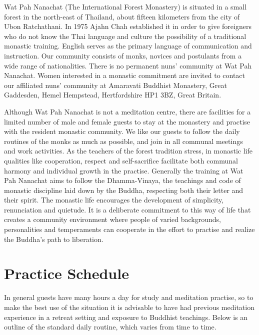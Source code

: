 
Wat Pah Nanachat (The International Forest Monastery) is situated in a
small forest in the north-east of Thailand, about fifteen kilometers
from the city of Ubon Ratchathani. In 1975 Ajahn Chah established it in
order to give foreigners who do not know the Thai language and culture
the possibility of a traditional monastic training. English serves as
the primary language of communication and instruction. Our community
consists of monks, novices and postulants from a wide range of
nationalities. There is no permanent nuns' community at Wat Pah
Nanachat. Women interested in a monastic commitment are invited to
contact our affiliated nuns' community at Amaravati Buddhist Monastery,
Great Gaddesden, Hemel Hempstead, Hertfordshire HP1 3BZ, Great Britain.

Although Wat Pah Nanachat is not a meditation centre, there are
facilities for a limited number of male and female guests to stay at the
monastery and practise with the resident monastic community. We like our
guests to follow the daily routines of the monks as much as possible,
and join in all communal meetings and work activities. As the teachers
of the forest tradition stress, in monastic life qualities like
cooperation, respect and self-sacrifice facilitate both communal harmony
and individual growth in the practise. Generally the training at Wat Pah
Nanachat aims to follow the Dhamma-Vinaya, the teachings and code of
monastic discipline laid down by the Buddha, respecting both their
letter and their spirit. The monastic life encourages the development of
simplicity, renunciation and quietude. It is a deliberate commitment to
this way of life that creates a community environment where people of
varied backgrounds, personalities and temperaments can cooperate in the
effort to practise and realize the Buddha's path to
liberation.

\section{Practice Schedule}

In general guests have many
hours a day for study and meditation practise, so to make the best use
of the situation it is advisable to have had previous meditation
experience in a retreat setting and exposure to Buddhist teachings.
Below is an outline of the standard daily routine, which varies from
time to time.

%

